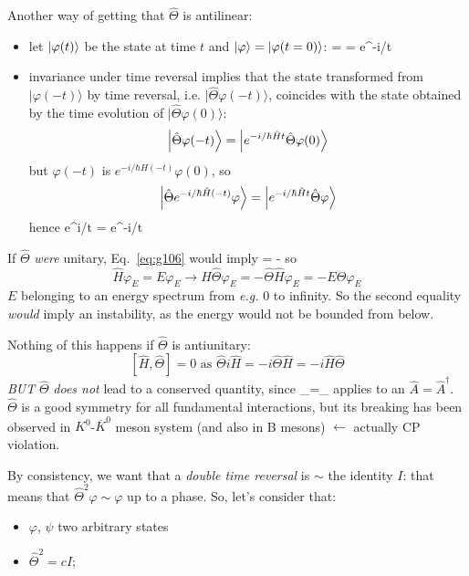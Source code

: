 \documentclass[12pt]{article}
\begin{document}
Another way of getting that $\hat{\Theta}$ is antilinear:
\begin{itemize}
\item let $\ket{\varphi(t)}$ be the state at time $t$ and $\ket{\varphi} = \ket{\varphi(t=0)}$:
\be
{} =  = e^{-i/\hbar{}t\ket{\varphi}}
\ee
%
\item invariance under time reversal implies that the
state transformed from $|\varphi(-t)\rangle$ by time reversal,
i.e. $|\hat{\Theta} \varphi(-t)\rangle$, coincides with the state obtained
by the time evolution of $|\hat{\Theta} \varphi(0)\rangle$:
\[
\ket{\hat{\Theta} \varphi(-t)} = \ket{e^{-i/\hbar\hat{H}t}\hat{\Theta}\varphi(0)}
\]
but $\varphi(-t)$ is $e^{-i/\hbar\hat{H}(-t)}\varphi(0)$, so
\[
\ket{\hat{\Theta} e^{-i/\hbar\hat{H}(-t)}\varphi} = \ket{e^{-i/\hbar\hat{H}t}\hat{\Theta}\varphi}
\]
hence
\be
\hat{\Theta}e^{i/\hbar{}t} = e^{-i/\hbar{}t}\hat{\Theta}
\label{eq:g106}
\ee
\end{itemize}
If $\hat{\Theta}$ \emph{were} unitary, Eq.~\eqref{eq:g106} would imply
\be
\hat{\Theta} = -\hat{\Theta}
\ee
so
\[
\hat{H}\varphi_E = E\varphi_E \to \hat{H}\hat{\Theta}\varphi_E 
= -\hat{\Theta}\hat{H}\varphi_E = -E\hat{\Theta}\varphi_E
\]
$E$ belonging to an energy spectrum 
from \textit{e.g.} 0 to infinity.
So the second equality 
\emph{would} imply an instability, 
as the energy would not be
bounded from below.


Nothing of this happens if $\hat{\Theta}$ is antiunitary:
\[
[\hat{H},\hat{\Theta}] = 0 \text{ as } 
\hat{\Theta}i\hat{H} = -i\hat{\Theta}\hat{H} = -i\hat{H}\hat{\Theta}
\]
\emph{BUT} $\hat{\Theta}$ \emph{does not} lead to a conserved quantity,
since
\be
{}\langle{}\rangle_{\varphi}=\rangle_{\varphi}
\ee
applies to an $\hat{A} = \hat{A}^{\dagger}$.
$\hat{\Theta}$ is a good symmetry for all fundamental interactions,
but its breaking has been observed in $K^0$-$\overline{K}^0$ meson
system (and also in B mesons) $\leftarrow$ actually CP violation.

By consistency, we want that a \emph{double time reversal} is $\sim$ the identity $I$: that means that $\hat{\Theta}^2\varphi\sim\varphi$ up to a phase. So, let's consider that:
\begin{itemize}
\item $\varphi$, $\psi$ two arbitrary states
\item $\hat{\Theta}^2 = cI$; 
\end{itemize}
\end{document}
